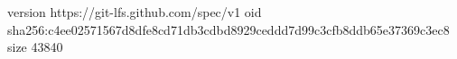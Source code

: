 version https://git-lfs.github.com/spec/v1
oid sha256:c4ee02571567d8dfe8cd71db3cdbd8929ceddd7d99c3cfb8ddb65e37369c3ec8
size 43840
